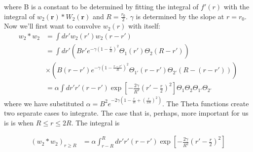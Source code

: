 \documentclass[letterpaper,twocolumn,amsmath,amssymb,prb]{revtex4-1}
\newcommand{\rr}{\textbf{r}}
\begin{document}
where B is a constant to be determined by fitting the integral of
$f'(r)$ with the integral of $w_2(\rr)\ast W_2(\rr)$ and $R =
\frac{r_0}{2}$.  $\gamma$ is determined by the slope at $r = r_0$.  
Now we'll first want to convolve $w_2(r)$ with
itself:
\begin{align*}
  w_2 \ast w_2 &= \int dr' w_2 (r')w_2(r - r') \\ 
     &= \int dr' \left(B r' e^{- \gamma \left (1 - \frac{r}{R} \right )^2}
                              \Theta_1 (r') \Theta_2 (R - r') \right) \\
     &\times \left( B (r-r') e^{- \gamma \left(1 - \frac{r-r'}{R}
                                \right)^2}\Theta_{1'} (r-r') \Theta_{2'} (R -
                                (r-r')) \right) \\
     &= \alpha \int dr' r'(r-r') \exp \left [-\frac{2\gamma}{R^2} \left (r' -
                              \frac{r}{2} \right)^2 \right ] \Theta_1
                              \Theta_2 \Theta_{1'} \Theta_{2'}
\end{align*}
where we have substituted $\alpha = B^2 e^{- 2 \gamma \left(1 -
  \frac{r}{R} + (\frac{r}{2R})^2 \right )}$. The Theta functions create two separate
cases to integrate.  The case that is, perhaps, more important for us
is is when $R \leq r \leq 2R$.  The integral is

\begin{align}
(w_2 \ast w_2)_{r \geq R} &= \alpha \int_{r - R}^R dr' r'(r-r') \exp \left [ -
   \frac {2\gamma}{R^2}\left( r' - \frac{r}{2} \right)^2 \right]
\end{align}
\end{document}
